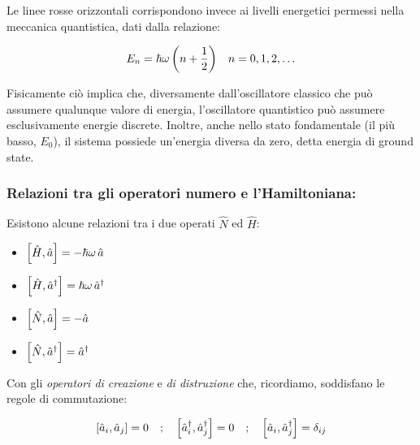 	Le linee rosse orizzontali corrispondono invece ai livelli energetici permessi nella meccanica quantistica, dati dalla relazione:
	
\begin{align*}
	E_n = \hbar \omega \, \qty( n + \frac{1}{2}) \quad n = 0, 1, 2, \ldots
\end{align*}
	
	Fisicamente ciò implica che, diversamente dall'oscillatore classico che può assumere qualunque valore di energia, l'oscillatore quantistico può assumere esclusivamente energie discrete. Inoltre, anche nello stato fondamentale (il più basso, $E_0$), il sistema possiede un'energia diversa da zero, detta energia di ground state.

\subsubsection{Relazioni tra gli operatori numero e l'Hamiltoniana:}
	
	Esistono alcune relazioni tra i due operati $\hat{N}$ ed $\hat{H}$:
	
\vspace{1em}
\begin{minipage}{0.7\textwidth}
\begin{itemize}
	\item $\qty[\hat{H}, \hat{a}]  = - \hbar \omega \, \hat{a}$
	\item $\qty[\hat{H}, \hat{a}^{\dagger}]  = \hbar \omega \, \hat{a}^{\dagger}$
\end{itemize}
\end{minipage}
\hfill
\begin{minipage}{0.3\textwidth}
\begin{itemize}
	\item $\qty[\hat{N}, \hat{a}]  = - \hat{a}$
	\item $\qty[\hat{N}, \hat{a}^{\dagger}]  = \hat{a}^{\dagger}$
\end{itemize}
\end{minipage}
\vspace{1em}

	Con gli \textit{operatori di creazione} e \textit{di distruzione} che, ricordiamo, soddisfano le regole di commutazione:
	
\begin{align*}
	\qty[\hat{a}_i, \hat{a}_j] = 0 \quad ; \quad \qty[\hat{a}^{\dagger}_i, \hat{a}^{\dagger}_j] = 0 \quad ; \quad \qty[\hat{a}_i, \hat{a}^{\dagger}_j] = \delta_{ij}
\end{align*}
	
